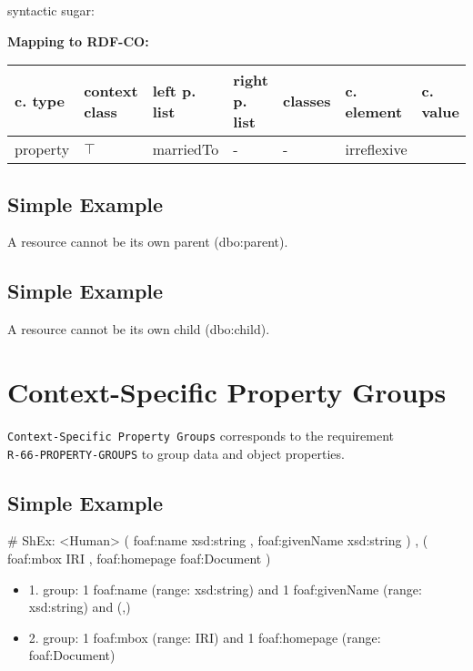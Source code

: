 \documentclass{llncs}
\newcommand{\ms}[1]{\texttt{#1}}
\newenvironment{gcotable}{
  \scriptsize
  \sffamily
  \vspace{0cm}
	\begin{center}
	\textbf{\vspace{0.4cm}Mapping to RDF-CO:} \\
  \begin{tabular}{l|l|l|l|l|l|l}
	\hline
  \textbf{c. type} & \textbf{context class} & \textbf{left p. list} & \textbf{right p. list} & \textbf{classes} & \textbf{c. element} & \textbf{c. value} \\
  \hline

}{
  \hline
  \end{tabular}
	\end{center}
}
\newenvironment{DL}{
  \vspace{0cm}
	\begin{center}
  \begin{tabular}{r l}

}{
  \end{tabular}
	\end{center}
}
\begin{document}
syntactic sugar:

\begin{gcotable}
property & $\top$ & marriedTo & - & - & irreflexive \\
\end{gcotable}

\subsection{Simple Example}

A resource cannot be its own parent (dbo:parent).

\subsection{Simple Example}

A resource cannot be its own child (dbo:child).

\section{Context-Specific Property Groups}

\ms{Context-Specific Property Groups} corresponds to the requirement \\
\ms{R-66-PROPERTY-GROUPS} to group data and object properties.

\subsection{Simple Example}

\begin{ex}
# ShEx:
<Human> { 
    (  
        foaf:name xsd:string ,
        foaf:givenName xsd:string 
    ) ,
    (
        foaf:mbox IRI ,
        foaf:homepage foaf:Document
    ) }
\end{ex}

\begin{itemize}
	\item 1. group: 1 foaf:name (range: xsd:string) and 1 foaf:givenName (range: xsd:string) and (,)
	\item 2. group: 1 foaf:mbox (range: IRI) and 1 foaf:homepage (range: foaf:Document) 
\end{itemize}

\end{document}
